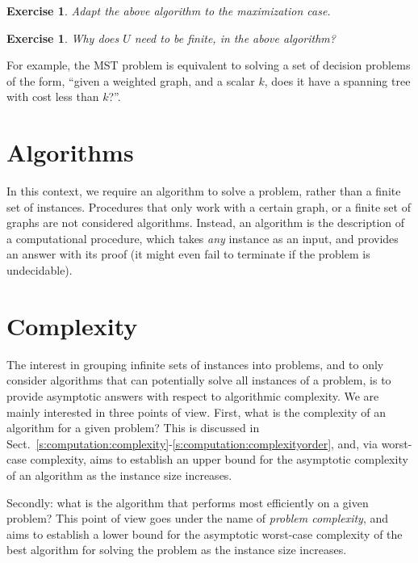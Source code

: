 \documentclass[a4paper]{book}
\theoremstyle{changebreak}                %
\newtheorem{ex}[result]{Exercise}
\begin{document}
\begin{ex}
Adapt the above algorithm to the maximization case.
\end{ex}

\begin{ex}
Why does $U$ need to be finite, in the above algorithm?
\end{ex}

For example, the MST problem is equivalent to solving a set
of decision problems of the form, ``given a weighted graph, and a
scalar $k$, does it have a spanning tree with cost less than $k$?''.

\section{Algorithms}
In this context, we require an algorithm to solve a
problem, rather than a finite set of instances. Procedures that only
work with a certain graph, or a finite set of graphs are
not considered algorithms. Instead, an algorithm is the description of
a computational procedure, which takes {\it any}
instance as an input, and provides an
answer with its proof (it might even fail to
terminate if the problem is
undecidable).

\section{Complexity}
\label{s:problem:complexity}
The interest in grouping infinite sets of instances into problems, and
to only consider algorithms that can potentially solve all instances
of a problem, is to provide asymptotic answers with respect to
algorithmic complexity. We are mainly interested in three points of
view. First, what is the complexity of an algorithm for a given
problem? This is discussed in
Sect.~\ref{s:computation:complexity}-\ref{s:computation:complexityorder},
and, via worst-case complexity, aims to
establish an upper bound for the
asymptotic complexity of an algorithm as the instance size increases.

Secondly: what is the algorithm that performs most efficiently on a
given problem?  This point of view goes under the name of {\it problem
  complexity}, and
aims to establish a lower bound for the
asymptotic worst-case complexity of the best algorithm for solving the
problem as the instance size increases.
\end{document}
